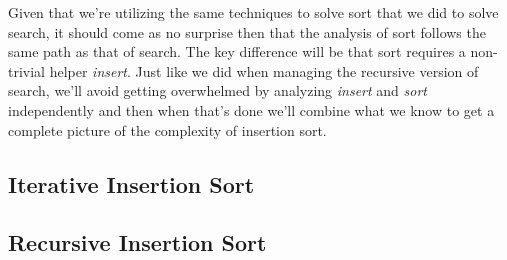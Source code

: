 \documentclass[]{tufte-handout}
\begin{document}
Given that we're utilizing the same techniques to solve sort that we did to solve search, it should come as no surprise then that the analysis of sort follows the same path as that of search. The key difference will be that sort requires a non-trivial helper \textit{insert}. Just like we did when managing the recursive version of search, we'll avoid getting overwhelmed by analyzing \textit{insert} and \textit{sort} independently and then when that's done we'll combine what we know to get a complete picture of the complexity of insertion sort. 

\subsection{Iterative Insertion Sort}

\subsection{Recursive Insertion Sort}
\end{document}
